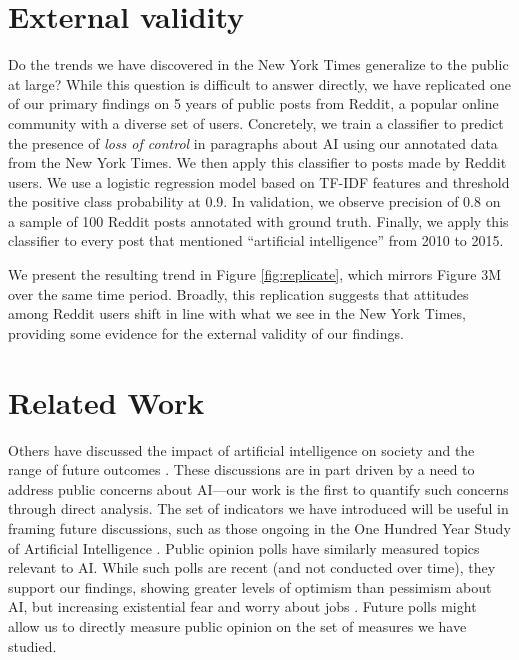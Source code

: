 \documentclass[letterpaper]{article}
\begin{document}
\vspace{-2.86mm}
\section{External validity}

Do the trends we have discovered in the New York Times generalize to the public at large? While this question is difficult to answer directly, we have replicated one of our primary findings on 5 years of public posts from Reddit, a popular online community with a diverse set of users.  Concretely, we train a classifier to predict the presence of \textit{loss of control} in paragraphs about AI using our annotated data from the New York Times. We then apply this classifier to posts made by Reddit users. We use a logistic regression model based on TF-IDF features and threshold the positive class probability at 0.9. In validation, we observe precision of 0.8 on a sample of 100 Reddit posts annotated with ground truth. Finally, we apply this classifier to every post that mentioned ``artificial intelligence'' from 2010 to 2015.

We present the resulting trend in Figure \ref{fig:replicate}, which mirrors Figure 3M over the same time period. Broadly, this replication suggests that attitudes among Reddit users shift in line with what we see in the New York Times, providing some evidence for the external validity of our findings.

\section{Related Work}

Others have discussed the impact of artificial intelligence on society and the range of future outcomes \cite{ai-concerns}. These discussions are in part driven by a need to address public concerns about AI---our work is the first to quantify such concerns through direct analysis. The set of indicators we have introduced will be useful in framing future discussions, such as those ongoing in the One Hundred Year Study of Artificial Intelligence \cite{100years}.  Public opinion polls have similarly measured topics relevant to AI. While such polls are recent (and not conducted over time), they support our findings, showing greater levels of optimism than pessimism about AI, but increasing existential fear and worry about jobs \cite{bsa-poll,cbs-poll}. Future polls might allow us to directly measure public opinion on the set of measures we have studied.
\end{document}
